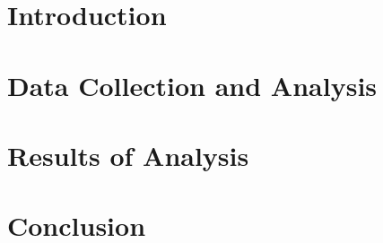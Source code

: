 \documentclass[letterpaper,12pt]{article}
\begin{document}




\printnomenclature[0.5in]

\section{Introduction}


\section{Data Collection and Analysis}%


\section{Results of Analysis}


\section{Conclusion}




\end{document}
